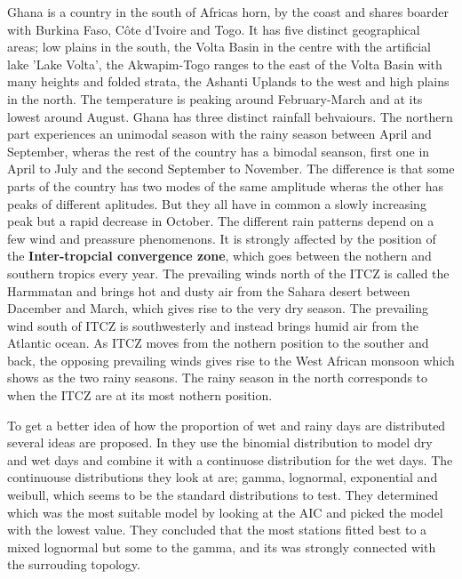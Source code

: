 \documentclass{article}
\begin{document}
	Ghana is a country in the south of Africas horn, by the coast and shares boarder with Burkina Faso, C\^{o}te d'Ivoire and Togo. It has five distinct geographical areas; low plains in the south, the Volta Basin in the centre with the artificial lake 'Lake Volta', the Akwapim-Togo ranges to the east of the Volta Basin with many heights and folded strata, the Ashanti Uplands to the west and high plains in the north\cite{fao}. The temperature is peaking around February-March and at its lowest around August. Ghana has three distinct rainfall behvaiours. The northern part experiences an unimodal season with the rainy season between April and September, wheras the rest of the country has a bimodal seanson, first one in April to July and the second September to November. The difference is that some parts of the country has two modes of the same amplitude wheras the other has peaks of different aplitudes. But they all have in common a slowly increasing peak but a rapid decrease in October.\cite{RainVarGhana} The different rain patterns depend on a few wind and preassure phenomenons. It is strongly affected by the  position of the \textbf{Inter-tropcial convergence zone}, which goes between the nothern and southern tropics every year. The prevailing winds north of the ITCZ is called the Harmmatan and brings hot and dusty air from the Sahara desert between Dacember and March, which gives rise to the very dry season. The prevailing wind south of ITCZ is southwesterly and instead brings humid air from the Atlantic ocean. As ITCZ moves from the nothern position to the souther and back, the opposing prevailing winds gives rise to the West African monsoon which shows as the two rainy seasons. The rainy season in the north corresponds to when the ITCZ are at its most nothern position\cite{RainVarGhana}.
	
	To get a better idea of how the proportion of wet and rainy days are distributed several ideas are proposed. In \cite{MalaysiaBin} they use the binomial distribution to model dry and wet days and combine it with a continuose distribution for the wet days. The continuouse distributions they look at are; gamma, lognormal, exponential and weibull, which seems to be the standard distributions to test. They determined which was the most suitable model by looking at the AIC and picked the model with the lowest value. They concluded that the most stations fitted best to a mixed lognormal but some to the gamma, and its was strongly connected with the surrouding topology. 
	
\end{document}

